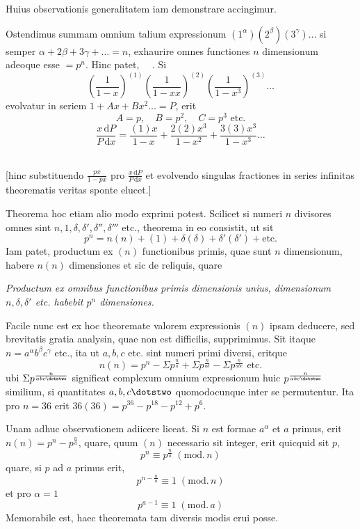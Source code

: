 Huius observationis generalitatem iam demonstrare accingimur.

Ostendimus summam omnium talium expressionum $(1^\alpha)(2^\beta)(3^\gamma)\ldots$ si semper $\alpha+2\beta+3\gamma+\ldots=n$, exhaurire omnes functiones $n$ dimensionum adeoque esse $=p^n$. Hinc patet, \textemdash\ \textemdash\ \textemdash. Si
\[
\left(\frac1{1-x}\right)^{(1)}\left(\frac1{1-xx}\right)^{(2)}\left(\frac1{1-x^3}\right)^{(3)}\ldots
\]
evolvatur in seriem $1+Ax+Bx^2\ldots=P$, erit
\[
A=p,\quad B=p^2,\quad C=p^3\text{ etc.}
\]
\[
\frac{x\,\mathrm{d}P}{P\,\mathrm{d}x}=\frac{(1)x}{1-x}+\frac{2(2)x^3}{1-x^2}+\frac{3(3)x^3}{1-x^3}\ldots
\]
\noindent\hspace*{.28\linewidth}\textemdash\ \textemdash\ \textemdash\ \textemdash

[hinc substituendo $\frac{px}{1-px}$ pro $\frac{x\,\mathrm{d}P}{P\,\mathrm{d}x}$ et evolvendo singulas fractiones in series infinitas theorematis veritas sponte elucet.]

Theorema hoc etiam alio modo exprimi potest. Scilicet si numeri $n$ divisores omnes sint $n,1,\delta,\delta',\delta'',\delta'''$ etc., theorema in eo consistit, ut sit
\[
p^n=n(n)+(1)+\delta(\delta)+\delta'(\delta')+\text{etc.}
\]
Iam patet, productum ex $(n)$ functionibus primis, quae sunt $n$ dimensionum, habere $n(n)$ dimensiones et sic de reliquis, quare

\emph{Productum ex omnibus functionibus primis dimensionis unius, dimensionum $n,\delta,\delta'$ etc. habebit $p^n$ dimensiones.}

Facile nunc est ex hoc theoremate valorem expressionis $(n)$ ipsam deducere, sed brevitatis gratia analysin, quae non est difficilis, supprimimus. Sit itaque $n=a^\alpha b^\beta c^\gamma$ etc., ita ut $a,b,c$ etc. sint numeri primi diversi, eritque
\[
n(n)=p^n-\Sigma p^{\frac na}+\Sigma p^{\frac n{ab}}-\Sigma p^{\frac n{abc}}\text{ etc.}
\]
ubi $\Sigma p^{\frac n{abc\dotstwo}}$ significat complexum omnium expressionum huic $p^{\frac n{abc\dotstwo}}$ similium, si quantitates $a,b,c\dotstwo$ quomodocunque inter se permutentur. Ita pro $n=36$ erit $36(36)=p^{36}-p^{18}-p^{12}+p^6$.

Unam adhuc observationem adiicere liceat. Si $n$ est formae $a^\alpha$ et $a$ primus, erit $n(n)=p^n-p^{\frac na}$, quare, quum $(n)$ necessario sit integer, erit quicquid sit $p$,
\[
p^n\equiv p^{\frac na}\;(\mathrm{mod.}\,n)
\]
quare, si $p$ ad $a$ primus erit,
\[
p^{n-\frac na}\equiv1\;(\mathrm{mod.}\,n)
\]
et pro $\alpha=1$
\[
p^{a-1}\equiv1\;(\mathrm{mod.}\,a)
\]
Memorabile est, haec theoremata tam diversis modis erui posse.
